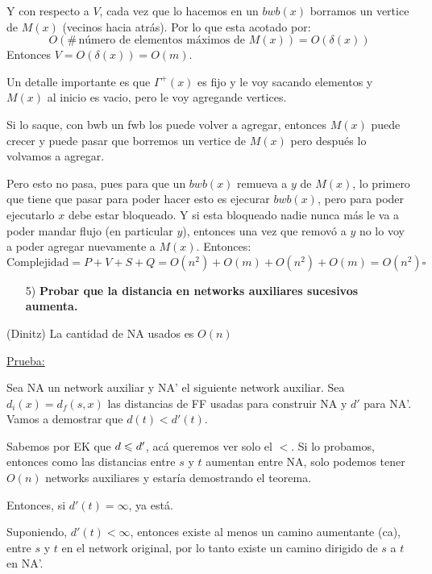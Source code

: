 \documentclass[12pt,a4paper]{article}
\begin{document}
Y con respecto a $V$, cada vez que lo hacemos en un $bwb(x)$ borramos un 
vertice de $M(x)$ (vecinos hacia atrás). Por lo que esta acotado por:
$$O(\#\,\text{número de elementos máximos de $M(x)$}) = O(\delta(x))$$ 
Entonces $V = O(\delta(x)) = O(m)$.
\medskip

Un detalle importante es que $\Gamma^{+}(x)$ es fijo y le voy sacando elementos y 
$M(x)$ al inicio es vacio, pero le voy agregande vertices.
\medskip

Si lo saque, con bwb un fwb los puede volver a agregar, entonces $M(x)$ puede 
crecer y puede pasar que borremos un vertice de $M(x)$ pero después lo volvamos 
a agregar.
\medskip

Pero esto no pasa, pues para que un $bwb(x)$ remueva a $y$ de $M(x)$, lo primero 
que tiene que pasar para poder hacer esto es ejecurar $bwb(x)$, pero para 
poder ejecutarlo $x$ debe estar bloqueado. Y si esta bloqueado nadie nunca más 
le va a poder mandar flujo (en particular $y$), entonces una vez que removó a $y$ 
no lo voy a poder agregar nuevamente a $M(x)$. Entonces:
$$\text{Complejidad} = P + V + S + Q = O(n^{2}) + O(m) + O(n^{2}) + O(m) = O(n^{2}) \square$$

\begin{itemize}
    \item [5)] \textbf{Probar que la distancia en networks auxiliares sucesivos aumenta.}
    \label{dem:dist2}
\end{itemize}

\begin{teorema} (Dinitz) La cantidad de NA usados es $O(n)$
\end{teorema}
\underline{Prueba:}
\medskip

Sea NA un network auxiliar y NA' el siguiente network auxiliar. Sea $d_{i}(x) = d_{f}(s,x)$ 
las distancias de FF usadas para construir NA y $d'$ para NA'. Vamos a demostrar que 
$d(t) < d'(t)$.
\medskip

Sabemos por EK que $d \leqslant d'$, acá queremos ver solo el $<$. Si lo probamos, entonces 
como las distancias entre $s$ y $t$ aumentan entre NA, solo podemos tener $O(n)$ 
networks auxiliares y estaría demostrando el teorema.
\medskip

Entonces, si $d'(t) = \infty$, ya está.
\medskip

Suponiendo, $d'(t) < \infty$, entonces existe al menos un camino aumentante (ca), 
entre $s$ y $t$ en el network original, por lo tanto existe un camino dirigido de 
$s$ a $t$ en NA'.
\medskip
\end{document}
